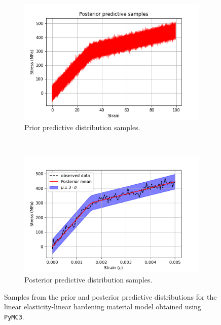 \documentclass{article}
\begin{document}
	\begin{figure}[htb!]
		\centering
		\begin{subfigure}[b]{0.45\textwidth}
			\centering
			\includegraphics[width=\textwidth]{Q3a_11.png}
			\caption{Prior predictive distribution samples.}
		\end{subfigure}
		~
		\begin{subfigure}[b]{0.45\textwidth}
			\centering
			\includegraphics[width=\textwidth]{Q3a_12.pdf}
			\caption{Posterior predictive distribution samples.}
		\end{subfigure}
		
		\caption{Samples from the prior and posterior predictive distributions for the linear elasticity-linear hardening material model obtained using \texttt{PyMC3}.}
		\label{fig:Q3_pymc3_prior_post_predictive_PyMC3}
	\end{figure}
\end{document}
